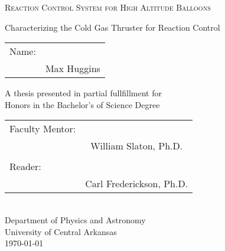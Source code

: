 \begin{titlepage}
    \begin{center}
        \vspace*{1cm}
            
        \large
        \textsc{Reaction Control System for High Altitude Balloons}
            
        \vspace{0.5cm}
        \normalsize
        Characterizing the Cold Gas Thruster for Reaction Control
            
        \vspace{1.5cm}
            
        \begin{tabular}{lp{2.5in}}
		Name:  & \hrulefill \\
		& \multicolumn{1}{c}{Max Huggins} \\
		\end{tabular}
        

            
        \vfill
        \small
        A thesis presented in partial fullfillment for\\
        Honors in the Bachelor's of Science Degree
            
        \vspace{1cm}
            

        \begin{tabular}{lp{2.5in}@{}}
		Faculty Mentor: & \hrulefill \\
		& \multicolumn{1}{c}{William Slaton, Ph.D.} \\
		& \\
		Reader: & \hrulefill \\
		& \multicolumn{1}{c}{Carl Frederickson, Ph.D.} \\
		\end{tabular}
		\vspace{1cm}\\
        Department of Physics and Astronomy\\
        University of Central Arkansas\\
        \today
            
    \end{center}
\end{titlepage}